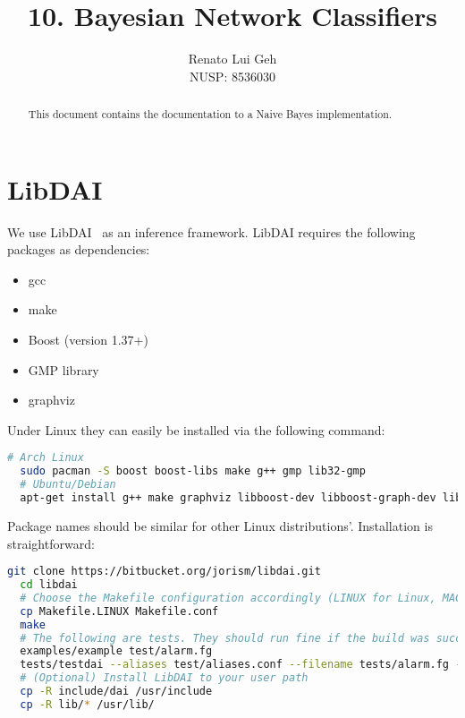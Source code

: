 \documentclass{amsart}
\title[]{10. Bayesian Network Classifiers}
\author[]{Renato Lui Geh\\NUSP\@: 8536030}
\theoremstyle{plain}
\begin{document}
\begin{abstract}
  This document contains the documentation to a Naive Bayes implementation.
  \vspace*{-2.5em}
\end{abstract}

\maketitle

\section{LibDAI}

We use LibDAI~\cite{Mooij_libDAI_10} as an inference framework. LibDAI requires the following
packages as dependencies:

\begin{itemize}
  \item gcc
  \item make
  \item Boost (version 1.37+)
  \item GMP library
  \item graphviz
\end{itemize}

Under Linux they can easily be installed via the following command:

\begin{lstlisting}[language=bash]
  # Arch Linux
  sudo pacman -S boost boost-libs make g++ gmp lib32-gmp
  # Ubuntu/Debian
  apt-get install g++ make graphviz libboost-dev libboost-graph-dev libboost-program-options-dev libboost-test-dev libgmp-dev
\end{lstlisting}

Package names should be similar for other Linux distributions'. Installation is straightforward:

\begin{lstlisting}[language=bash]
  git clone https://bitbucket.org/jorism/libdai.git
  cd libdai
  # Choose the Makefile configuration accordingly (LINUX for Linux, MACOSX for OS X, etc.)
  cp Makefile.LINUX Makefile.conf
  make
  # The following are tests. They should run fine if the build was successful
  examples/example test/alarm.fg
  tests/testdai --aliases test/aliases.conf --filename tests/alarm.fg --methods JTREE_HUGIN BP_SEQMAX
  # (Optional) Install LibDAI to your user path
  cp -R include/dai /usr/include
  cp -R lib/* /usr/lib/
\end{lstlisting}
\end{document}
